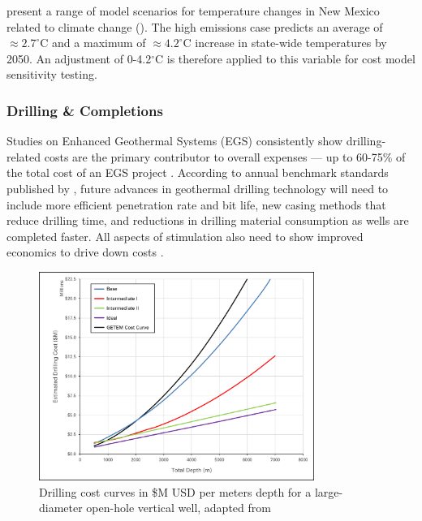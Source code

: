 \citeauthor{frankson_new_2019} present a range of model scenarios for temperature changes in New Mexico related to climate change (\citeyear[Figure 1]{frankson_new_2019}). The high emissions case predicts an average of $\approx 2.7^\circ$C and a maximum of $\approx 4.2^\circ$C increase in state-wide temperatures by 2050. An adjustment of 0-4.2$^\circ$C is therefore applied to this variable for cost model sensitivity testing.

\subsubsection{Drilling \& Completions}\label{ch4:drilling_uncertainty}
Studies on Enhanced Geothermal Systems (EGS) consistently show drilling-related costs are the primary contributor to overall expenses --- up to 60-75\% of the total cost of an EGS project \citep{lukawski_uncertainty_2016}. According to annual benchmark standards published by \citet{nrel_2020_2020}, future advances in geothermal drilling technology will need to include more efficient penetration rate and bit life, new casing methods that reduce drilling time, and reductions in drilling material consumption as wells are completed faster. All aspects of stimulation also need to show improved economics to drive down costs \citep{nrel_2020_2020}.

\begin{figure}[!htp]
\centering
\includegraphics[width=0.8\textwidth]{templates/images/Figure-Drilling_Cost_Curves.png}
\singlespacing
\caption[GeoVision drilling cost curves]{Drilling cost curves in \$M USD per meters depth for a large-diameter open-hole vertical well, adapted from \citep[Figure 8]{augustine_geovision_2019}}
\label{fig:drill_cost_curves}
\end{figure}

